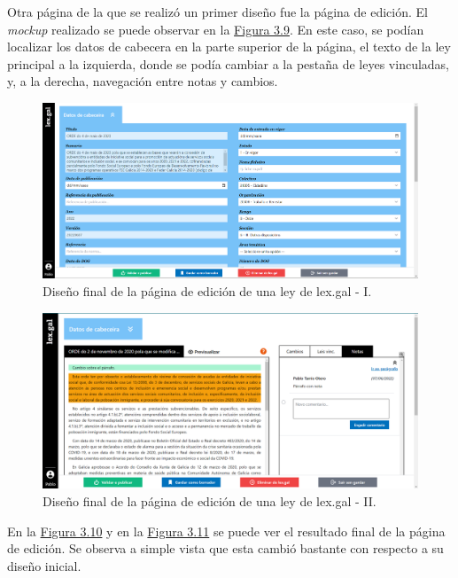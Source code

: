 Otra página de la que se realizó un primer diseño fue la página de edición. El {\it mockup} realizado se puede observar en la \hyperref[enlaceMockupEdicionDiseno]{Figura 3.9}. En este caso, se podían localizar los datos de cabecera en la parte superior de la página, el texto de la ley principal a la izquierda, donde se podía cambiar a la pestaña de leyes vinculadas, y, a la derecha, navegación entre notas y cambios.

\begin{figure}[H]
\centerline{\includegraphics[width=13cm]{figuras/manualUsuario/EditarCabecera.PNG}}
\caption{Diseño final de la página de edición de una ley de lex.gal - I.}
\label{enlaceCabeceraDiseno}
\end{figure}

\begin{figure}[H]
\centerline{\includegraphics[width=13cm]{figuras/manualUsuario/PestanaNotas.PNG}}
\caption{Diseño final de la página de edición de una ley de lex.gal - II.}
\label{enlaceEdicionLexGalDiseno}
\end{figure}

En la \hyperref[enlaceCabeceraDiseno]{Figura 3.10} y en la \hyperref[enlaceEdicionLexGalDiseno]{Figura 3.11} se puede ver el resultado final de la página de edición. Se observa a simple vista que esta cambió bastante con respecto a su diseño inicial.
\\

